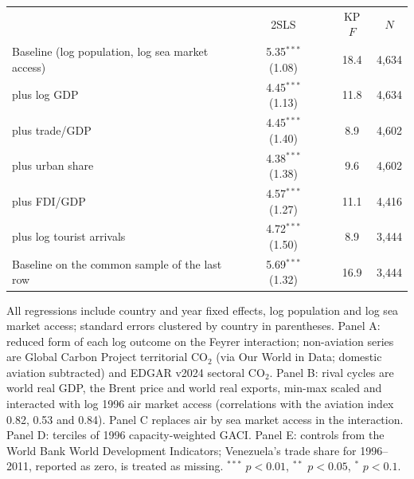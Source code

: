 \documentclass[12pt]{extarticle}
\begin{document}
\begin{table}[H]
{\begin{threeparttable}
\begin{tabular}{lcccc}
 & 2SLS & & KP $F$ & $N$ \\
  Baseline (log population, log sea market access) & 5.35$^{***}$ (1.08) & & 18.4 & 4,634 \\
  \quad plus log GDP & 4.45$^{***}$ (1.13) & & 11.8 & 4,634 \\
  \quad plus trade/GDP & 4.45$^{***}$ (1.40) & & 8.9 & 4,602 \\
  \quad plus urban share & 4.38$^{***}$ (1.38) & & 9.6 & 4,602 \\
  \quad plus FDI/GDP & 4.57$^{***}$ (1.27) & & 11.1 & 4,416 \\
  \quad plus log tourist arrivals & 4.72$^{***}$ (1.50) & & 8.9 & 3,444 \\
  Baseline on the common sample of the last row & 5.69$^{***}$ (1.32) & & 16.9 & 3,444 \\
\bottomrule
\end{tabular}
\begin{tablenotes}\scriptsize
\item All regressions include country and year fixed effects, log population and log sea market access; standard errors clustered by country in parentheses. Panel A: reduced form of each log outcome on the Feyrer interaction; non-aviation series are Global Carbon Project territorial CO$_2$ (via Our World in Data; domestic aviation subtracted) and EDGAR v2024 sectoral CO$_2$. Panel B: rival cycles are world real GDP, the Brent price and world real exports, min-max scaled and interacted with log 1996 air market access (correlations with the aviation index 0.82, 0.53 and 0.84). Panel C replaces air by sea market access in the interaction. Panel D: terciles of 1996 capacity-weighted GACI. Panel E: controls from the World Bank World Development Indicators; Venezuela's trade share for 1996--2011, reported as zero, is treated as missing. $^{***}$ $p<0.01$, $^{**}$ $p<0.05$, $^{*}$ $p<0.1$.
\end{tablenotes}
\end{threeparttable}}
\end{table}
\end{document}
